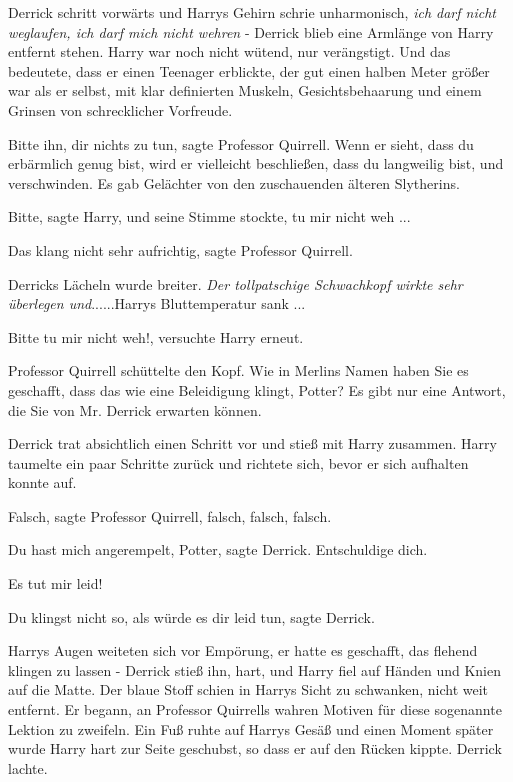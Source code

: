 Derrick schritt vorwärts und Harrys Gehirn schrie unharmonisch, \emph{ich darf
nicht weglaufen, ich darf mich nicht wehren} - Derrick blieb eine Armlänge von
Harry entfernt stehen. Harry war noch nicht wütend, nur verängstigt. Und das
bedeutete, dass er einen Teenager erblickte, der gut einen halben Meter größer
war als er selbst, mit klar definierten Muskeln, Gesichtsbehaarung und einem
Grinsen von schrecklicher Vorfreude.

\glqq{}Bitte ihn, dir nichts zu tun\grqq{}, sagte Professor Quirrell. \glqq{}Wenn
er sieht, dass du erbärmlich genug bist, wird er vielleicht beschließen, dass du
langweilig bist, und verschwinden.\grqq{} Es gab Gelächter von den zuschauenden
älteren Slytherins.

\glqq{}Bitte\grqq{}, sagte Harry, und seine Stimme stockte, \glqq{}tu mir nicht
weh ...\grqq{}

\glqq{}Das klang nicht sehr aufrichtig\grqq{}, sagte Professor Quirrell.

Derricks Lächeln wurde breiter. \emph{Der tollpatschige Schwachkopf wirkte sehr
überlegen und}......Harrys Bluttemperatur sank ...

\glqq{}Bitte tu mir nicht weh!\grqq{}, versuchte Harry erneut.

Professor Quirrell schüttelte den Kopf. \glqq{}Wie in Merlins Namen haben Sie es
geschafft, dass das wie eine Beleidigung klingt, Potter? Es gibt nur eine
Antwort, die Sie von Mr. Derrick erwarten können.\grqq{}

Derrick trat absichtlich einen Schritt vor und stieß mit Harry zusammen. Harry
taumelte ein paar Schritte zurück und richtete sich, bevor er sich aufhalten
konnte auf.

\glqq{}Falsch\grqq{}, sagte Professor Quirrell, \glqq{}falsch, falsch,
falsch.\grqq{}

\glqq{}Du hast mich angerempelt, Potter\grqq{}, sagte Derrick. \glqq{}Entschuldige
dich.\grqq{}

\glqq{}Es tut mir leid!\grqq{}

\glqq{}Du klingst nicht so, als würde es dir leid tun\grqq{}, sagte Derrick.

Harrys Augen weiteten sich vor Empörung, er hatte es geschafft, das flehend
klingen zu lassen - Derrick stieß ihn, hart, und Harry fiel auf Händen und Knien
auf die Matte. Der blaue Stoff schien in Harrys Sicht zu schwanken, nicht weit
entfernt. Er begann, an Professor Quirrells wahren Motiven für diese sogenannte
Lektion zu zweifeln. Ein Fuß ruhte auf Harrys Gesäß und einen Moment später
wurde Harry hart zur Seite geschubst, so dass er auf den Rücken kippte. Derrick
lachte.

